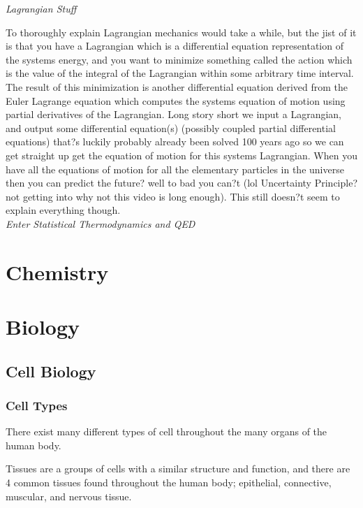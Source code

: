 \documentclass{article}
\begin{document}
\textit{Lagrangian Stuff}

To thoroughly explain Lagrangian mechanics would take a while, but the jist of it is that you have a Lagrangian which is a differential equation representation of the systems energy, and you want to minimize something called the action which is the value of the integral of the Lagrangian within some arbitrary time interval. The result of this minimization is another differential equation derived from the Euler Lagrange equation which computes the systems equation of motion using partial derivatives of the Lagrangian. Long story short we input a Lagrangian, and output some differential equation(s) (possibly coupled partial differential equations) that?s luckily probably already been solved 100 years ago so we can get straight up get the equation of motion for this systems Lagrangian. When you have all the equations of motion for all the elementary particles in the universe then you can predict the future? well to bad you can?t (lol Uncertainty Principle? not getting into why not this video is long enough). This still doesn?t seem to explain everything though. \\

\textit{Enter Statistical Thermodynamics and QED}
  
\section{Chemistry}


\section{Biology}
\subsection{Cell Biology}
\subsubsection{Cell Types}

    There exist many different types of cell throughout the many organs of the human body.
    
    Tissues are a groups of cells with a similar structure and function, and there are 4 common tissues found throughout the human body; epithelial, connective, muscular, and nervous tissue. 
\end{document}

